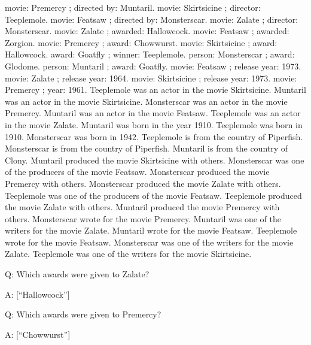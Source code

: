 \documentclass[
]{article}
\begin{document}
movie: Premercy ; directed by: Muntaril. movie: Skirtsicine ; director:
Teeplemole. movie: Featsaw ; directed by: Monsterscar. movie: Zalate ;
director: Monsterscar. movie: Zalate ; awarded: Hallowcock. movie:
Featsaw ; awarded: Zorgion. movie: Premercy ; award: Chowwurst. movie:
Skirtsicine ; award: Hallowcock. award: Goatfly ; winner: Teeplemole.
person: Monsterscar ; award: Glodome. person: Muntaril ; award: Goatfly.
movie: Featsaw ; release year: 1973. movie: Zalate ; release year: 1964.
movie: Skirtsicine ; release year: 1973. movie: Premercy ; year: 1961.
Teeplemole was an actor in the movie Skirtsicine. Muntaril was an actor
in the movie Skirtsicine. Monsterscar was an actor in the movie
Premercy. Muntaril was an actor in the movie Featsaw. Teeplemole was an
actor in the movie Zalate. Muntaril was born in the year 1910.
Teeplemole was born in 1910. Monsterscar was born in 1942. Teeplemole is
from the country of Piperfish. Monsterscar is from the country of
Piperfish. Muntaril is from the country of Clony. Muntaril produced the
movie Skirtsicine with others. Monsterscar was one of the producers of
the movie Featsaw. Monsterscar produced the movie Premercy with others.
Monsterscar produced the movie Zalate with others. Teeplemole was one of
the producers of the movie Featsaw. Teeplemole produced the movie Zalate
with others. Muntaril produced the movie Premercy with others.
Monsterscar wrote for the movie Premercy. Muntaril was one of the
writers for the movie Zalate. Muntaril wrote for the movie Featsaw.
Teeplemole wrote for the movie Featsaw. Monsterscar was one of the
writers for the movie Zalate. Teeplemole was one of the writers for the
movie Skirtsicine.

Q: Which awards were given to Zalate?

A: {[}``Hallowcock''{]}

Q: Which awards were given to Premercy?

A: {[}``Chowwurst''{]}
\end{document}
